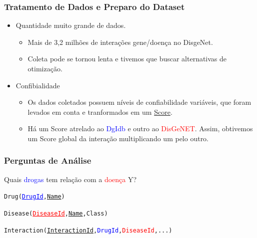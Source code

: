 \documentclass[12pt]{beamer}
\begin{document}
\begin{frame}
  \frametitle{Tratamento de Dados e Preparo do Dataset}

  \begin{itemize}
    \item Quantidade muito grande de dados.
          \begin{itemize}
            \item Mais de 3,2 milhões de interações gene/doença no DisgeNet.
            \item Coleta pode se tornou lenta e tivemos que buscar alternativas de otimização.
          \end{itemize}
    \item Confibialidade
          \begin{itemize}
            \item Os dados coletados possuem níveis de confiabilidade
                  variáveis, que foram levados em conta e tranformados em um \underline{Score}.
            \item Há um Score atrelado ao \textcolor{blue}{DgIdb} e outro ao \textcolor{red}{DisGeNET}. Assim, obtivemos um Score global da interação multiplicando um pelo outro.      
          \end{itemize}
  \end{itemize}
\end{frame}

\begin{frame}
  \frametitle{Perguntas de Análise}

  Quais \textcolor{blue}{drogas} tem relação com a \textcolor{red}{doença} Y?
  \pause

  \begin{alltt}\small
    Drug(\textcolor{blue}{\underline{DrugId}}, \underline{Name})
    
    Disease(\textcolor{red}{\underline{DiseaseId}}, \underline{Name}, Class)

    Interaction(\underline{InteractionId}, \textcolor{blue}{DrugId}, \textcolor{red}{DiseaseId}, ...)
                  
  \end{alltt}
\end{frame}
\end{document}
